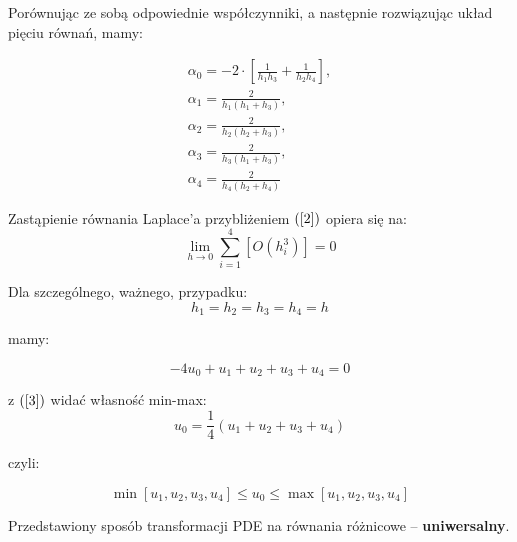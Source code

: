 \begin{frame}
  Porównując ze sobą odpowiednie współczynniki, a następnie rozwiązując układ pięciu równań, mamy:
  \begin{block}{}
    $$ \begin{array}{l}
    \alpha_0 = -2 \cdot \left[ \frac{1}{h_1 h_3} + \frac{1}{h_2 h_4} \right], \\
    \alpha_1 = \frac{2}{h_1 (h_1 + h_3)}, \\
    \alpha_2 = \frac{2}{h_2 (h_2 + h_3)}, \\ 
    \alpha_3 = \frac{2}{h_3 (h_1 + h_3)}, \\
    \alpha_4 = \frac{2}{h_4 (h_2 + h_4)}
    \end{array}$$
  \end{block}

  Zastąpienie równania Laplace'a przybliżeniem $(\ref{2})$ opiera się na:
  $$ \lim_{h \rightarrow 0} \sum_{i=1}^4 [O(h_i^3)] = 0$$ %
\end{frame}

\begin{frame}
  Dla szczególnego, ważnego, przypadku:
  $$ h_1 = h_2 = h_3 = h_4 = h $$

  mamy:

  \begin{equation} \label{3} -4 u_0 + u_1 + u_2 + u_3 + u_4 = 0 \end{equation}

  z $(\ref{3})$ widać własność min-max:
  $$ u_0 = \frac{1}{4} (u_1 + u_2 + u_3 + u_4) $$

  czyli:
  \begin{block}{}
    $$ \min[u_1, u_2, u_3, u_4] \le u_0 \le \max[u_1, u_2, u_3, u_4] $$
  \end{block}

  Przedstawiony sposób transformacji PDE na równania różnicowe -- \textbf{uniwersalny}.
\end{frame}
